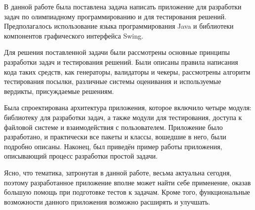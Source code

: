 В данной работе была поставлена задача написать приложение для разработки задач по олимпиадному программированию и для тестирования решений. Предполагалось использование языка программирования Java и библиотеки компонентов графического интерфейса Swing.

Для решения поставленной задачи были рассмотрены основные принципы разработки задач и тестирования решений. Были описаны правила написания кода таких средств, как генераторы, валидаторы и чекеры, рассмотрены алгоритм тестирования посылки, различные системы оценивания и используемые вердикты, присуждаемые решениям.

Была спроектирована архитектура приложения, которое включило четыре модуля: библиотеку для разработки задач, а также модули для тестирования, доступа к файловой системе и взаимодействия с пользователем. Приложение было разработано, и практически все пакеты и классы, вошедшие в него, были подробно описаны. Наконец, был приведён пример работы приложения, описывающий процесс разработки простой задачи.

Ясно, что тематика, затронутая в данной работе, весьма актуальна сегодня, поэтому разработанное приложение вполне может найти себе применение, оказав большую помощь при подготовке тестов к задачам. Кроме того, функциональные возможности данного приложения возможно расширять и улучшать.